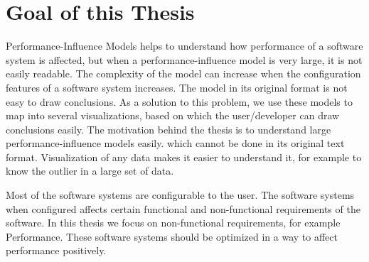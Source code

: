 

\section{Goal of this Thesis}
Performance-Influence Models helps to understand how performance of a software system is affected, but when a performance-influence model is very large, it is not easily readable. The complexity of the model can increase when the configuration features of a software system increases.
The model in its original format is not easy to draw conclusions.
As a solution to this problem, we use these models to map into several visualizations, based on which the user/developer can draw conclusions easily.
The motivation behind the thesis is to understand large performance-influence models easily. which cannot be done in its original text format.
Visualization of any data makes it easier to understand it, for example to know the outlier in a large set of data.

Most of the software systems are configurable to the user. The  software systems when configured affects certain functional and non-functional requirements of the software. In this thesis we focus on non-functional requirements, for example Performance. These software systems should be optimized in a way to affect performance positively.




\todots 
